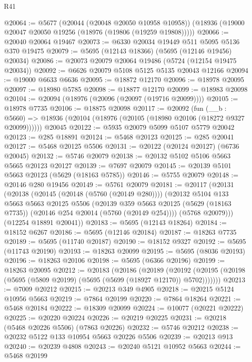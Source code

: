 \begin{lexlean}{R41}
\begin{coremodule}
@20064 := @5677
    (@20044 (@20048 @20050 @10958 @10958))
    (@18936 (@19000 @20047 @20050 @19256 (@18976 (@19806 (@19259 @19808)))))
@20066 := @20040 @20064 @19467
@20073 := @6330 @20034 @19449 @511 @5095 @5136 @370 @19475
@20079 := @5695 (@12143 @18366) (@5695 (@12146 @19456) @20034)
@20086 := @20073 @20079 @20064 @19486 (@5724 (@12154 @19475 @20034))
@20092 := @6626 @20079 @5108 @5125 @5135 @20043 @12166
@20094 := @19000 @6633 @6636
@20095 := @18872 @12170
@20096 := @18978 @20095
@20097 := @18980 @5785
@20098 := @18877 @12170
@20099 := @18983 @20098
@20104 := @20094 (@18976 (@20096 (@20097 (@19716 @20099))))
@20105 := @18978 @7735
@20106 := @18875 @20098
@20117 := @20092
    (fun (__b : @5660) => @18936 (@20104 (@18976 (@20105 (@18980 @20106 (@18272 @9327 @20099))))))
    @20045
@20122 := @5935 @20079 @5099 @5107 @5779 @20042
@20123 := @285 @18891
@20124 := @5468 @20123
@20125 := @285 @20041
@20127 := @5468 @20125 @5506
@20131 := @20122 (@20124 @20127) (@6736 @20045)
@20132 := @5746 @20079
@20138 := @20132 @5102 @5106 @5663 @5665 @20123 @20127
@20139 := @7697 @20079
@20145 := @20139 @5101 @5663 @20123 (@5629 (@18163 @5785))
@20146 := @5755 @20079
@20148 := @20146 @280 @19456
@20149 := @5761 @20079
@20181 := @20117
    (@20131
      (@20138
        (@20145 (@20148 (@5760 (@20149 @280))))
        (@20132
          @5104
          @133
          @5663
          @5663
          @20125
          @5506
          (@20139
            @359
            @5663
            @20125
            (@5629 (@18163 @7735))
            (@20146 @254 @20014 (@5760 (@20149 @254))))
          (@5768 @20079)))
      (@12254 @18891 @20041))
@20183 := @5695 (@12143 @18264)
@20184 := @18152 @6267
@20186 := @5695 (@12146 @20184)
@20187 := @18263 @7735
@20189 := @5695 (@11740 @20187)
@20190 := @18152 @9327
@20192 := @5695 (@11743 @20190)
@20193 := @18263 @20099
@20195 := @5695 (@8036 @20193)
@20196 := @18263 @20106
@20198 := @5695 (@6366 @20196)
@20199 := @18263 @20095
@20212 := @20183
    (@20186
      (@20189
        (@20192 (@20195 (@20198 (@5695 (@5809 @20199) (@5695 (@5699 (@18927 @12170)) @5702)))))))
@20213 := @7009 @20212
@20215 := @20213 @349 @4905
@20218 := @20215 @5124 @10956 @5663
@20219 := @7864 @20199
@20220 := @7864 @18264
@20221 := @5468 @20184
@20222 := @18309 @20099
@20224 := @10077 (@20221 @20222)
@20225 := @20220 @20224
@20226 := @20219 @20225
@20231 := @20218 (@5468 @20226 @5506) (@7863 @20226)
@20232 := @5746 @20212
@20238 := @20232 @5122 @133 @10954 @5663 @20226 @5506
@20239 := @20213 @913
@20240 := @20239 @4808
@20243 := @20240 @5121 @10952 @5663
@20244 := @5468 @20199

\end{coremodule}
\end{lexlean}
